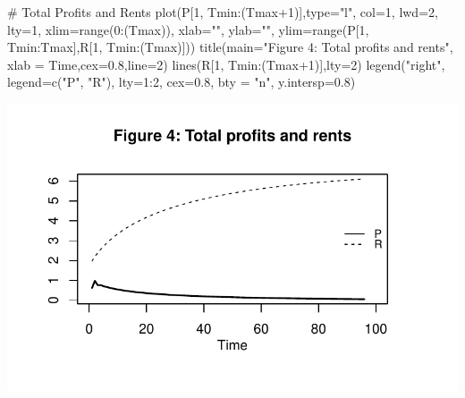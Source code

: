 \documentclass[
  letterpaper,
  DIV=11,
  numbers=noendperiod]{scrreprt}
\newenvironment{Shaded}{\begin{snugshade}}{\end{snugshade}}
\newcommand{\AttributeTok}[1]{\textcolor[rgb]{0.40,0.45,0.13}{#1}}
\newcommand{\CommentTok}[1]{\textcolor[rgb]{0.37,0.37,0.37}{#1}}
\newcommand{\DecValTok}[1]{\textcolor[rgb]{0.68,0.00,0.00}{#1}}
\newcommand{\FloatTok}[1]{\textcolor[rgb]{0.68,0.00,0.00}{#1}}
\newcommand{\FunctionTok}[1]{\textcolor[rgb]{0.28,0.35,0.67}{#1}}
\newcommand{\NormalTok}[1]{\textcolor[rgb]{0.00,0.23,0.31}{#1}}
\newcommand{\SpecialCharTok}[1]{\textcolor[rgb]{0.37,0.37,0.37}{#1}}
\newcommand{\StringTok}[1]{\textcolor[rgb]{0.13,0.47,0.30}{#1}}
\begin{document}
\begin{Shaded}
\begin{Highlighting}[]
\CommentTok{\# Total Profits and Rents}
\FunctionTok{plot}\NormalTok{(P[}\DecValTok{1}\NormalTok{, Tmin}\SpecialCharTok{:}\NormalTok{(Tmax}\SpecialCharTok{+}\DecValTok{1}\NormalTok{)],}\AttributeTok{type=}\StringTok{"l"}\NormalTok{, }\AttributeTok{col=}\DecValTok{1}\NormalTok{, }\AttributeTok{lwd=}\DecValTok{2}\NormalTok{, }\AttributeTok{lty=}\DecValTok{1}\NormalTok{, }\AttributeTok{xlim=}\FunctionTok{range}\NormalTok{(}\DecValTok{0}\SpecialCharTok{:}\NormalTok{(Tmax)), }\AttributeTok{xlab=}\StringTok{""}\NormalTok{, }\AttributeTok{ylab=}\StringTok{""}\NormalTok{, }\AttributeTok{ylim=}\FunctionTok{range}\NormalTok{(P[}\DecValTok{1}\NormalTok{, Tmin}\SpecialCharTok{:}\NormalTok{Tmax],R[}\DecValTok{1}\NormalTok{, Tmin}\SpecialCharTok{:}\NormalTok{(Tmax)])) }
\FunctionTok{title}\NormalTok{(}\AttributeTok{main=}\StringTok{"Figure 4: Total profits and rents"}\NormalTok{, }\AttributeTok{xlab =} \StringTok{\textquotesingle{}Time\textquotesingle{}}\NormalTok{,}\AttributeTok{cex=}\FloatTok{0.8}\NormalTok{,}\AttributeTok{line=}\DecValTok{2}\NormalTok{)}
\FunctionTok{lines}\NormalTok{(R[}\DecValTok{1}\NormalTok{, Tmin}\SpecialCharTok{:}\NormalTok{(Tmax}\SpecialCharTok{+}\DecValTok{1}\NormalTok{)],}\AttributeTok{lty=}\DecValTok{2}\NormalTok{)}
\FunctionTok{legend}\NormalTok{(}\StringTok{"right"}\NormalTok{, }\AttributeTok{legend=}\FunctionTok{c}\NormalTok{(}\StringTok{"P"}\NormalTok{, }\StringTok{"R"}\NormalTok{),}
       \AttributeTok{lty=}\DecValTok{1}\SpecialCharTok{:}\DecValTok{2}\NormalTok{, }\AttributeTok{cex=}\FloatTok{0.8}\NormalTok{, }\AttributeTok{bty =} \StringTok{"n"}\NormalTok{, }\AttributeTok{y.intersp=}\FloatTok{0.8}\NormalTok{)}
\end{Highlighting}
\end{Shaded}

\includegraphics{a_ricardian_two_sector_model_files/figure-pdf/ricardo2_2-4.pdf}
\end{document}
